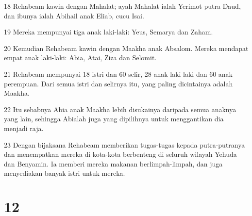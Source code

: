 \par 18 Rehabeam kawin dengan Mahalat; ayah Mahalat ialah Yerimot putra Daud, dan ibunya ialah Abihail anak Eliab, cucu Isai.
\par 19 Mereka mempunyai tiga anak laki-laki: Yeus, Semarya dan Zaham.
\par 20 Kemudian Rehabeam kawin dengan Maakha anak Absalom. Mereka mendapat empat anak laki-laki: Abia, Atai, Ziza dan Selomit.
\par 21 Rehabeam mempunyai 18 istri dan 60 selir, 28 anak laki-laki dan 60 anak perempuan. Dari semua istri dan selirnya itu, yang paling dicintainya adalah Maakha.
\par 22 Itu sebabnya Abia anak Maakha lebih disukainya daripada semua anaknya yang lain, sehingga Abialah juga yang dipilihnya untuk menggantikan dia menjadi raja.
\par 23 Dengan bijaksana Rehabeam memberikan tugas-tugas kepada putra-putranya dan menempatkan mereka di kota-kota berbenteng di seluruh wilayah Yehuda dan Benyamin. Ia memberi mereka makanan berlimpah-limpah, dan juga menyediakan banyak istri untuk mereka.

\chapter{12}

